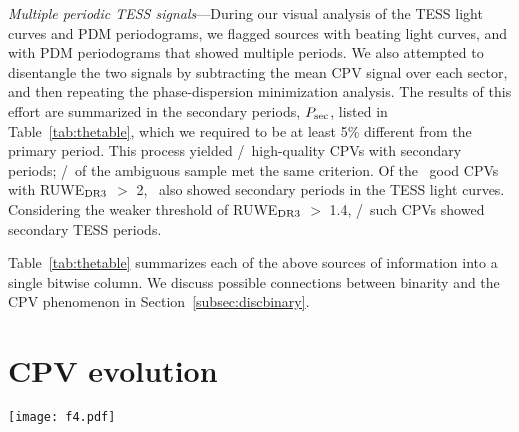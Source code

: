 \documentclass[11pt,twocolumn,tighten]{aastex63}
\begin{document}
{\it Multiple periodic TESS signals}---During our visual analysis of
the TESS light curves and PDM periodograms, we flagged sources with
beating light curves, and with PDM periodograms that showed multiple
periods.  We also attempted to disentangle the two signals by
subtracting the mean CPV signal over each sector, and then repeating
the phase-dispersion minimization analysis.  The results of this effort
are summarized in the secondary periods, $P_{\rm sec}$, listed in
Table~\ref{tab:thetable}, which we required to be at least 5\%
different from the primary period.  This process yielded
\ngoodmultperiodflag/\ngoods\ high-quality CPVs with secondary
periods; \nmaybemultperiodflag/\nmaybes\ of the ambiguous sample met
the same criterion.  Of the \ngoodhighruwe\ good CPVs with RUWE$_{\rm
DR3}$ $>$ 2, \ngoodruweandmultperiod\ also showed secondary periods in
the TESS light curves.  Considering the weaker threshold of RUWE$_{\rm
DR3}$ $>$ 1.4, \ngoodweakruweandmultperiod/\ngoodweakruwe\ such CPVs
showed secondary TESS periods.

Table~\ref{tab:thetable} summarizes each of the above sources of
information into a single bitwise column.  We discuss possible
connections between binarity and the CPV phenomenon in
Section~\ref{subsec:discbinary}.


\section{CPV evolution}
\label{sec:evoln}

\begin{figure*}[!tp]
	\begin{center}
		\centering
		\texttt{[image: f4.pdf]}
		\vspace{-0.6cm}
		\caption{
			{\bf Evolution of CPV light curves over two years.}
			Out of the \ngoods\ CPVs in Figure~\ref{fig:cqvs}, 32 had
			120-second cadence TESS data available for a baseline of at
			least two years; the 27 brightest are shown here due to space
			constraints.  Each panel shows one sector of TESS data, and is
			phased to its deepest minimum in flux.  Each panel's title shows
			the TIC identifier and period in hours.  Text insets
			show the TESS sector numbers, which generally span two years, or
			at least 1{,}000 cycles.  The vertical scale is fixed across
			sectors to clarify shape changes.  Gray circles are raw 2-minute
			data; colored circles bin to 300 points per cycle. 
		}
		\label{fig:evoln}
	\end{center}
\end{figure*}
\end{document}
